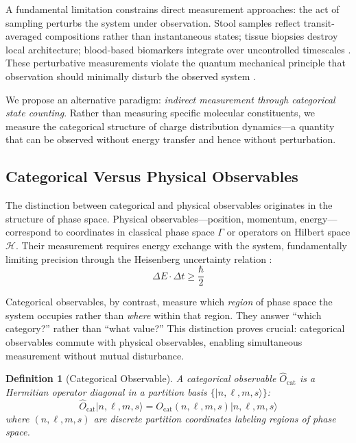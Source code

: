\documentclass[twocolumn,10pt]{article}
\newtheorem{definition}[theorem]{Definition}
\begin{document}
A fundamental limitation constrains direct measurement approaches: the act of sampling perturbs the system under observation. Stool samples reflect transit-averaged compositions rather than instantaneous states; tissue biopsies destroy local architecture; blood-based biomarkers integrate over uncontrolled timescales \cite{costea2017}. These perturbative measurements violate the quantum mechanical principle that observation should minimally disturb the observed system \cite{braginsky1992}.

We propose an alternative paradigm: \textit{indirect measurement through categorical state counting}. Rather than measuring specific molecular constituents, we measure the categorical structure of charge distribution dynamics---a quantity that can be observed without energy transfer and hence without perturbation.

\subsection{Categorical Versus Physical Observables}

The distinction between categorical and physical observables originates in the structure of phase space. Physical observables---position, momentum, energy---correspond to coordinates in classical phase space $\Gamma$ or operators on Hilbert space $\mathcal{H}$. Their measurement requires energy exchange with the system, fundamentally limiting precision through the Heisenberg uncertainty relation \cite{heisenberg1927}:
\begin{equation}
    \Delta E \cdot \Delta t \geq \frac{\hbar}{2}
    \label{eq:heisenberg}
\end{equation}

Categorical observables, by contrast, measure which \textit{region} of phase space the system occupies rather than \textit{where} within that region. They answer ``which category?'' rather than ``what value?'' This distinction proves crucial: categorical observables commute with physical observables, enabling simultaneous measurement without mutual disturbance.

\begin{definition}[Categorical Observable]
\label{def:categorical_observable}
A categorical observable $\hat{O}_{\text{cat}}$ is a Hermitian operator diagonal in a partition basis $\{|n, \ell, m, s\rangle\}$:
\begin{equation}
    \hat{O}_{\text{cat}} |n, \ell, m, s\rangle = O_{\text{cat}}(n, \ell, m, s) |n, \ell, m, s\rangle
\end{equation}
where $(n, \ell, m, s)$ are discrete partition coordinates labeling regions of phase space.
\end{definition}
\end{document}
